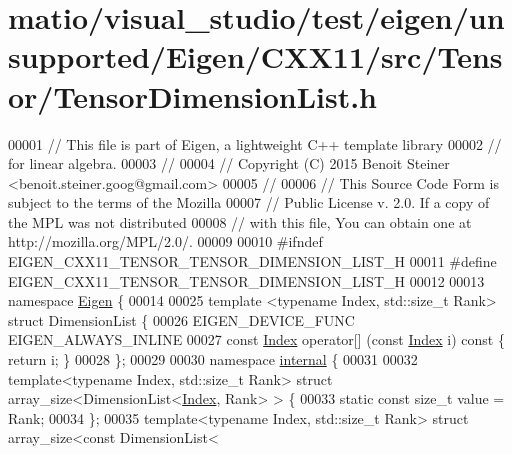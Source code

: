 \hypertarget{matio_2visual__studio_2test_2eigen_2unsupported_2_eigen_2_c_x_x11_2src_2_tensor_2_tensor_dimension_list_8h_source}{}\section{matio/visual\+\_\+studio/test/eigen/unsupported/\+Eigen/\+C\+X\+X11/src/\+Tensor/\+Tensor\+Dimension\+List.h}
\label{matio_2visual__studio_2test_2eigen_2unsupported_2_eigen_2_c_x_x11_2src_2_tensor_2_tensor_dimension_list_8h_source}

\begin{DoxyCode}
00001 \textcolor{comment}{// This file is part of Eigen, a lightweight C++ template library}
00002 \textcolor{comment}{// for linear algebra.}
00003 \textcolor{comment}{//}
00004 \textcolor{comment}{// Copyright (C) 2015 Benoit Steiner <benoit.steiner.goog@gmail.com>}
00005 \textcolor{comment}{//}
00006 \textcolor{comment}{// This Source Code Form is subject to the terms of the Mozilla}
00007 \textcolor{comment}{// Public License v. 2.0. If a copy of the MPL was not distributed}
00008 \textcolor{comment}{// with this file, You can obtain one at http://mozilla.org/MPL/2.0/.}
00009 
00010 \textcolor{preprocessor}{#ifndef EIGEN\_CXX11\_TENSOR\_TENSOR\_DIMENSION\_LIST\_H}
00011 \textcolor{preprocessor}{#define EIGEN\_CXX11\_TENSOR\_TENSOR\_DIMENSION\_LIST\_H}
00012 
00013 \textcolor{keyword}{namespace }\hyperlink{namespace_eigen}{Eigen} \{
00014 
00025 \textcolor{keyword}{template} <\textcolor{keyword}{typename} Index, std::\textcolor{keywordtype}{size\_t} Rank> \textcolor{keyword}{struct }DimensionList \{
00026   EIGEN\_DEVICE\_FUNC EIGEN\_ALWAYS\_INLINE
00027   \textcolor{keyword}{const} \hyperlink{namespace_eigen_a62e77e0933482dafde8fe197d9a2cfde}{Index} operator[] (\textcolor{keyword}{const} \hyperlink{namespace_eigen_a62e77e0933482dafde8fe197d9a2cfde}{Index} i)\textcolor{keyword}{ const }\{ \textcolor{keywordflow}{return} i; \}
00028 \};
00029 
00030 \textcolor{keyword}{namespace }\hyperlink{namespaceinternal}{internal} \{
00031 
00032 \textcolor{keyword}{template}<\textcolor{keyword}{typename} Index, std::\textcolor{keywordtype}{size\_t} Rank> \textcolor{keyword}{struct }array\_size<DimensionList<\hyperlink{namespace_eigen_a62e77e0933482dafde8fe197d9a2cfde}{Index}, Rank> > \{
00033   \textcolor{keyword}{static} \textcolor{keyword}{const} \textcolor{keywordtype}{size\_t} value = Rank;
00034 \};
00035 \textcolor{keyword}{template}<\textcolor{keyword}{typename} Index, std::\textcolor{keywordtype}{size\_t} Rank> \textcolor{keyword}{struct }array\_size<const DimensionList<

\end{DoxyCode}
